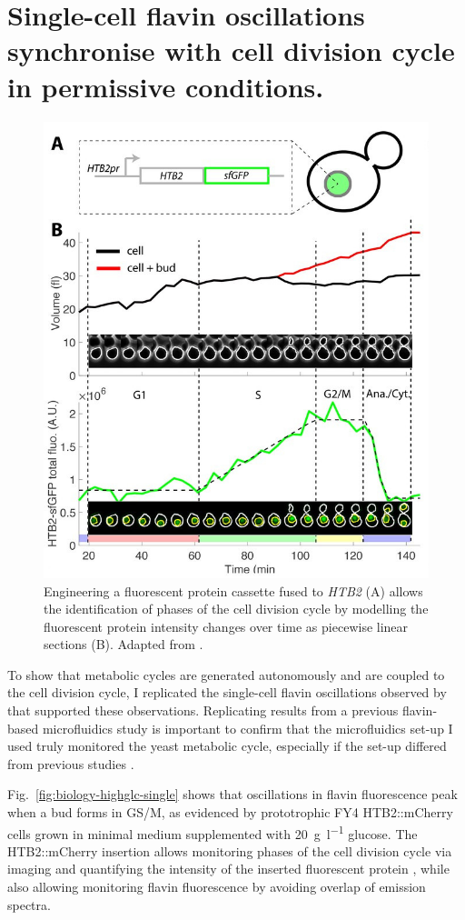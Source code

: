 \section[Permissive conditions]{Single-cell flavin oscillations synchronise with cell division cycle in permissive conditions.}
\label{sec:biology-sync}

\begin{figure}
  \centering
    \includegraphics[width=0.5\linewidth]{garmendia-torresMultipleInputsEnsure2018_1_adapted.jpg}
    \caption{
      Engineering a fluorescent protein cassette fused to \textit{HTB2} (A) allows the identification of phases of the cell division cycle by modelling the fluorescent protein intensity changes over time as piecewise linear sections (B).
      Adapted from \textcite{garmendia-torresMultipleInputsEnsure2018}.
    }
  \label{fig:biology-htb2}
\end{figure}

To show that metabolic cycles are generated autonomously and are coupled to the cell division cycle, I replicated the single-cell flavin oscillations observed by \textcite{baumgartnerFlavinbasedMetabolicCycles2018} that supported these observations.
Replicating results from a previous flavin-based microfluidics study is important to confirm that the microfluidics set-up I used truly monitored the yeast metabolic cycle, especially if the set-up differed from previous studies \parencite{papagiannakisAutonomousMetabolicOscillations2017, baumgartnerFlavinbasedMetabolicCycles2018}.

Fig.\ \ref{fig:biology-highglc-single} shows that oscillations in flavin fluorescence peak when a bud forms in GS/M, as evidenced by prototrophic FY4 HTB2::mCherry cells grown in minimal medium supplemented with \SI{20}{\gram~\litre^{-1}} glucose.
The HTB2::mCherry insertion allows monitoring phases of the cell division cycle via imaging and quantifying the intensity of the inserted fluorescent protein \parencite{garmendia-torresMultipleInputsEnsure2018}, while also allowing monitoring flavin fluorescence by avoiding overlap of emission spectra.


